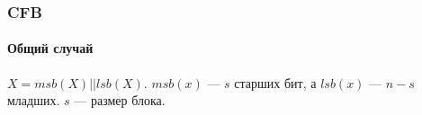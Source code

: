 \begin{frame}
    \frametitle{CFB}
    \framesubtitle{Общий случай}
    
    \begin{figure}
        \begin{center}
        \end{center}
    \end{figure} 
    $X=msb(X)||lsb(X)$. $msb(x)$ --- $s$ старших бит, а $lsb(x)$ --- $n-s$ младших. $s$ --- размер блока. 
\end{frame}


